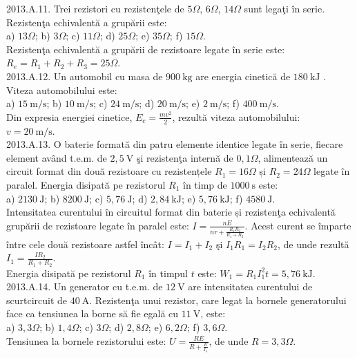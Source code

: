 2013.A.11. Trei rezistori cu rezistenţele de $5 \Omega$, $6 \Omega$, $14 \Omega$ sunt legaţi în serie. Rezistenţa echivalentă a grupării este:\\ a) $13 \Omega$; b) $3 \Omega$; c) $11 \Omega$; d) $25 \Omega$; e) $35 \Omega$; f) $15 \Omega$.\\ Rezistenţa echivalentă a grupării de rezistoare legate în serie este:\\ $R_{e}=R_{1}+R_{2}+R_{3}=25 \Omega$.\\

2013.A.12. Un automobil cu masa de $900 \mathrm{~kg}$ are energia cinetică de $180 \mathrm{~kJ}$ . Viteza automobilului este:\\ a) $15 \mathrm{~m} / \mathrm{s}$; b) $10 \mathrm{~m} / \mathrm{s}$; c) $24 \mathrm{~m} / \mathrm{s}$; d) $20 \mathrm{~m} / \mathrm{s}$; e) $2 \mathrm{~m} / \mathrm{s}$; f) $400 \mathrm{~m} / \mathrm{s}$.\\ Din expresia energiei cinetice, $E_{c}=\frac{m v^{2}}{2}$, rezultă viteza automobilului:\\ $v=20 \mathrm{~m} / \mathrm{s}$.\\

2013.A.13. O baterie formată din patru elemente identice legate în serie, fiecare element având t.e.m. de $2,5 \mathrm{~V}$ şi rezistenţa internă de $0,1 \Omega$, alimentează un circuit format din două rezistoare cu rezistențele $R_{1}=16 \Omega$ și $R_{2}=24 \Omega$ legate în paralel. Energia disipată pe rezistorul $R_{1}$ în timp de $1000 \mathrm{~s}$ este:\\ a) $2130 \mathrm{~J}$; b) $8200 \mathrm{~J}$; c) $5,76 \mathrm{~J}$; d) $2,84 \mathrm{~kJ}$; e) $5,76 \mathrm{~kJ}$; f) $4580 \mathrm{~J}$.\\ Intensitatea curentului în circuitul format din baterie și rezistenţa echivalentă grupării de rezistoare legate în paralel este: $I=\frac{n E}{n r+\frac{R_{1} R_{2}}{R_{1}+R_{2}}}$. Acest curent se împarte între cele două rezistoare astfel încât: $I=I_{1}+I_{2}$ şi $I_{1} R_{1}=I_{2} R_{2}$, de unde rezultă $I_{1}=\frac{I R_{2}}{R_{1}+R_{2}}$.\\ Energia disipată pe rezistorul $R_{1}$ în timpul $t$ este: $W_{1}=R_{1} I_{1}^{2} t=5,76 \mathrm{~kJ}$.\\

2013.A.14. Un generator cu t.e.m. de $12 \mathrm{~V}$ are intensitatea curentului de scurtcircuit de $40 \mathrm{~A}$. Rezistenţa unui rezistor, care legat la bornele generatorului face ca tensiunea la borne să fie egală cu $11 \mathrm{~V}$, este:\\ a) $3,3 \Omega$; b) $1,4 \Omega$; c) $3 \Omega$; d) $2,8 \Omega$; e) $6,2 \Omega$; f) $3,6 \Omega$.\\ Tensiunea la bornele rezistorului este: $U=\frac{R E}{R+\frac{E}{I_{s}}}$, de unde $R=3,3 \Omega$.\\

